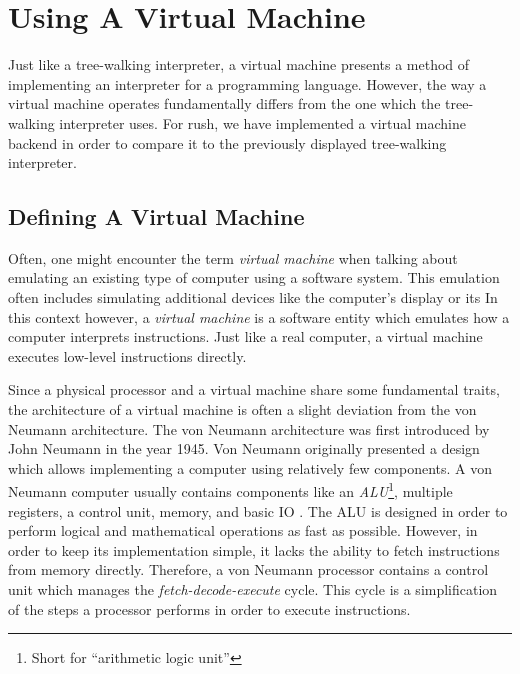 \section{Using A Virtual Machine}

Just like a tree-walking interpreter, a virtual machine presents a method of implementing an interpreter for a programming language.
However, the way a virtual machine operates fundamentally differs from the one which the tree-walking interpreter uses.
For rush, we have implemented a virtual machine backend in order to compare it to the previously displayed tree-walking interpreter.

\subsection{Defining A Virtual Machine}

Often, one might encounter the term \emph{virtual machine} when talking about emulating an existing type of computer using a software system.
This emulation often includes simulating additional devices like the computer's display or its In this context however, a \emph{virtual machine} is a software entity which emulates how a computer interprets instructions.
Just like a real computer, a virtual machine executes low-level instructions directly.

Since a physical processor and a virtual machine share some fundamental traits,
the architecture of a virtual machine is often a slight deviation from the von Neumann architecture.
The von Neumann architecture was first introduced by John Neumann in the year 1945.
Von Neumann originally presented a design which allows implementing a computer using relatively few components.
A von Neumann computer usually contains components like an \emph{ALU}\footnote{Short for \enquote{arithmetic logic unit}}, multiple registers, a control unit, memory, and basic IO \cite[p.~172]{Ledin2020-yp}.
The ALU is designed in order to perform logical and mathematical operations as fast as possible.
However, in order to keep its implementation simple, it lacks the ability to fetch instructions from memory directly.
Therefore, a von Neumann processor contains a control unit which manages the \emph{fetch-decode-execute} cycle.
This cycle is a simplification of the steps a processor performs in order to execute instructions.

